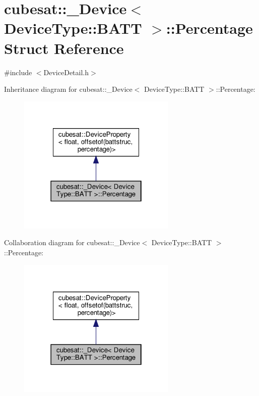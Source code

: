 \hypertarget{structcubesat_1_1__Device_3_01DeviceType_1_1BATT_01_4_1_1Percentage}{}\section{cubesat\+:\+:\+\_\+\+Device$<$ Device\+Type\+:\+:B\+A\+TT $>$\+:\+:Percentage Struct Reference}
\label{structcubesat_1_1__Device_3_01DeviceType_1_1BATT_01_4_1_1Percentage}


{\ttfamily \#include $<$Device\+Detail.\+h$>$}



Inheritance diagram for cubesat\+:\+:\+\_\+\+Device$<$ Device\+Type\+:\+:B\+A\+TT $>$\+:\+:Percentage\+:\nopagebreak
\begin{figure}[H]
\begin{center}
\leavevmode
\includegraphics[width=214pt]{structcubesat_1_1__Device_3_01DeviceType_1_1BATT_01_4_1_1Percentage__inherit__graph}
\end{center}
\end{figure}


Collaboration diagram for cubesat\+:\+:\+\_\+\+Device$<$ Device\+Type\+:\+:B\+A\+TT $>$\+:\+:Percentage\+:\nopagebreak
\begin{figure}[H]
\begin{center}
\leavevmode
\includegraphics[width=214pt]{structcubesat_1_1__Device_3_01DeviceType_1_1BATT_01_4_1_1Percentage__coll__graph}
\end{center}
\end{figure}

